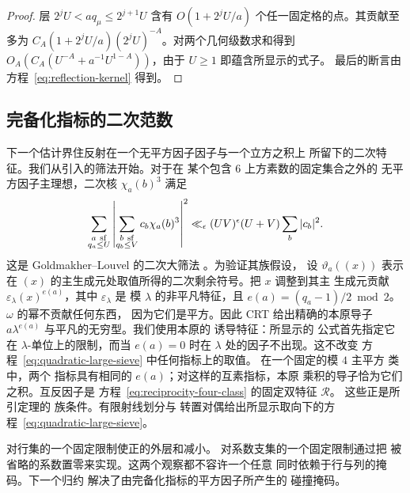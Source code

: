 \documentclass[11pt,a4paper]{article}
\numberwithin{equation}{section}
\numberwithin{figure}{section}
\theoremstyle{definition}
\theoremstyle{remark}
\begin{document}
\begin{proof}
层 $2^jU<a q_\mu\le2^{j+1}U$ 含有
$O(1+2^jU/a)$ 个任一固定格的点。其贡献至多为
$C_A(1+2^jU/a)(2^jU)^{-A}$。对两个几何级数求和得到
$O_A(C_A(U^{-A}+a^{-1}U^{1-A}))$，由于 $U\ge1$ 即蕴含所显示的式子。
最后的断言由方程~\eqref{eq:reflection-kernel} 得到。
\end{proof}

\subsection{完备化指标的二次范数}

下一个估计界住反射在一个无平方因子因子与一个立方之积上
所留下的二次特征。我们从引入的筛法开始。对于在
某个包含 \(6\) 上方素数的固定集合之外的
无平方因子主理想，二次核 \(\chi_a(b)^3\) 满足
\begin{equation}\label{eq:quadratic-large-sieve}
 \sum_{\substack{a\ {\rm sf}\\q_a\le U}}
 \left|\sum_{\substack{b\ {\rm sf}\\q_b\le V}}
             c_b\chi_a(b)^3\right|^2
 \ll_\epsilon (UV)^\epsilon(U+V)\sum_b|c_b|^2.
\end{equation}
这是 Goldmakher--Louvel 的二次大筛法
\cite[定义 1 与定理 1.1]{GL}。为验证其族假设，
设 \(\vartheta_a((x))\) 表示在
\((x)\) 的主生成元处取值所得的二次剩余符号。把 \(x\) 调整到其主
生成元贡献
\(\varepsilon_\lambda(x)^{e(a)}\)，其中 \(\varepsilon_\lambda\) 是
模 \(\lambda\) 的非平凡特征，且
\(e(a)=(q_a-1)/2\bmod2\)。\(\omega\) 的幂不贡献任何东西，
因为它们是平方。因此 CRT 给出精确的本原导子
\(a\lambda^{e(a)}\) 与平凡的无穷型。我们使用本原的
诱导特征：所显示的
公式首先指定它在 \(\lambda\)-单位上的限制，而当
\(e(a)=0\) 时在 \(\lambda\) 处的因子不出现。这不改变
方程~\eqref{eq:quadratic-large-sieve} 中任何指标上的取值。
在一个固定的模 \(4\) 主平方
类中，两个
指标具有相同的 \(e(a)\)；对这样的互素指标，本原
乘积的导子恰为它们之积。互反因子是
方程~\eqref{eq:reciprocity-four-class} 的固定双特征 \(\mathcal R\)。
这些正是所引定理的
族条件。有限射线划分与
转置对偶给出所显示取向下的方程~\eqref{eq:quadratic-large-sieve}。

对行集的一个固定限制使正的外层和减小。
对系数支集的一个固定限制通过把
被省略的系数置零来实现。这两个观察都不容许一个任意
同时依赖于行与列的掩码。下一个归约
解决了由完备化指标的平方因子所产生的
碰撞掩码。
\end{document}

